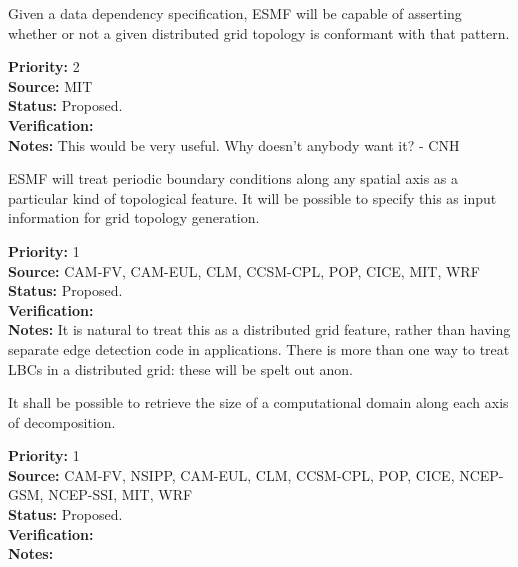 
Given a data dependency specification, ESMF will be capable of
asserting whether or not a given distributed grid topology is
conformant with that pattern.

\begin{reqlist}
{\bf Priority:} 2 \\ 
{\bf Source:} MIT \\
{\bf Status:} Proposed. \\
{\bf Verification:} \\
{\bf Notes:} This would be very useful. Why doesn't anybody want it? - CNH
\end{reqlist}


ESMF will treat periodic boundary conditions along any spatial axis as
a particular kind of topological feature. It will be possible to
specify this as input information for grid topology generation.

\begin{reqlist}
{\bf Priority:} 1 \\ 
{\bf Source:} CAM-FV, CAM-EUL, CLM, CCSM-CPL, POP, CICE, MIT, WRF \\
{\bf Status:} Proposed. \\
{\bf Verification:} \\
{\bf Notes:} It is natural to treat this as a distributed grid
  feature, rather than having separate edge detection code in
  applications. There is more than one way to treat LBCs in a
  distributed grid: these will be spelt out anon.
   
\end{reqlist}




It shall be possible to retrieve the size of a computational domain
along each axis of decomposition.

\begin{reqlist}
{\bf Priority:} 1 \\ 
{\bf Source:} CAM-FV, NSIPP, CAM-EUL, CLM, CCSM-CPL, POP, CICE, NCEP-GSM, NCEP-SSI, MIT, WRF \\
{\bf Status:} Proposed. \\
{\bf Verification:} \\
{\bf Notes:}
\end{reqlist}

